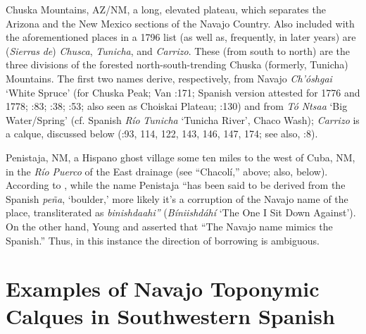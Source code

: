 Chuska Mountains, AZ/NM, a long, elevated plateau, which separates the Arizona and the New Mexico sections of the Navajo Country.  Also included with the aforementioned places in a 1796 list (as well as, frequently, in later years) are (\textit{Sierras} \textit{de}) \textit{Chusca}, \textit{Tunicha}, and \textit{Carrizo}.  These (from south to north) are the three divisions of the forested north-south-trending Chuska (formerly, Tunicha) Mountains.  The first two names derive, respectively, from Navajo \textit{Ch'óshgai} ‘White Spruce’ (for Chuska Peak; Van \citealt{Valkenburgh1974}:171; Spanish version attested for 1776 and 1778; \citealt{Julyan1998}:83; \citealt{Kessell2013}:38; \citealt{Eidenbach2012}:53; also seen as Choiskai Plateau; \citealt{Dutton1886}:130) and from \textit{Tó} \textit{Ntsaa} ‘Big Water/Spring’ (cf. Spanish \textit{Río} \textit{Tunicha} ‘Tunicha River’, Chaco Wash); \textit{Carrizo} is a calque, discussed below (\citealt{Correll1979}:93, 114, 122, 143, 146, 147, 174; see also, \citealt{BarnesGranger1960}:8).  

Penistaja, NM, a Hispano ghost village some ten miles to the west of Cuba, NM, in the \textit{Río} \textit{Puerco} of the East drainage (see “Chacolí,” above; also, below).  According to \citet[263]{Julyan1998}, while the name Penistaja “has been said to be derived from the Spanish \textit{peña}, ‘boulder,’ more likely it’s a corruption of the Navajo name of the place, transliterated as \textit{binishdaahi”} (\textit{Bíniishdáhí} ‘The One I Sit Down Against’).  On the other hand, Young and \citet[243]{Morgan1980} asserted that “The Navajo name mimics the Spanish.”  Thus, in this instance the direction of borrowing is ambiguous.

\section{\textbf{Examples} \textbf{of} \textbf{Navajo} \textbf{Toponymic} \textbf{Calques} \textbf{in} \textbf{Southwestern} \textbf{Spanish}}

